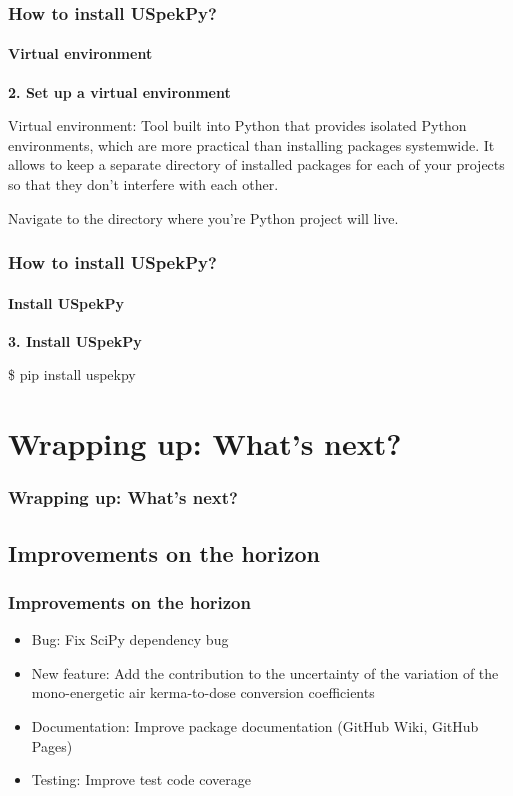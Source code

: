 \documentclass{beamer}
\newcommand{\highlight}[1]{{\color{blue} #1}}
\begin{document}
	\begin{frame}
		\frametitle{How to install USpekPy?}
		\framesubtitle{Virtual environment}
		\textbf{2. Set up a virtual environment}
		
		\highlight{Virtual environment}: 
		Tool built into Python that provides isolated Python environments, which are more practical than installing packages systemwide.
		It allows to keep a separate directory of installed packages for each of your projects so that they don’t interfere with each other.
		
		Navigate to the directory where you're Python project will live.
	\end{frame}
	
	\begin{frame}
		\frametitle{How to install USpekPy?}
		\framesubtitle{Install USpekPy}		
		\textbf{3. Install USpekPy}
		\begin{block}{}
			\begin{semiverbatim}
				\$ pip install uspekpy
			\end{semiverbatim}
		\end{block}
	\end{frame}
	
	
	\section{Wrapping up: What’s next?}
		
	\begin{frame}
		\frametitle{Wrapping up: What’s next?}
		\tableofcontents[
		currentsection,
		sectionstyle=show/shaded,
		subsectionstyle=show/show/hide
		]
	\end{frame}
	
	\subsection{Improvements on the horizon}
	
	\begin{frame}
		\frametitle{Improvements on the horizon}
		\begin{itemize}
			\setlength\itemsep{1em}
			\item \highlight{Bug}: Fix SciPy dependency bug
			\item \highlight{New feature}: Add the contribution to the \highlight{uncertainty} of the variation of the mono-energetic air kerma-to-dose conversion coefficients
			\item \highlight{Documentation}: Improve package documentation (GitHub Wiki, GitHub Pages)
			\item \highlight{Testing}: Improve test code coverage
		\end{itemize}			
	\end{frame}
	
\end{document}
